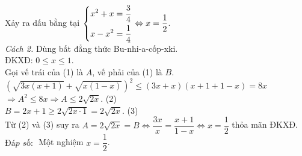 \begin{bt}
{\begin{enumerate}[a)]
    Xảy ra dấu bằng tại $\left\{\begin{aligned}&x^2+x=\dfrac{3}{4}\\&x-x^2=\dfrac{1}{4}\end{aligned}\right.\Leftrightarrow x=\dfrac{1}{2}$.\\
    \textit{Cách 2. }Dùng bất đẳng thức Bu-nhi-a-cốp-xki.\\
ĐKXĐ: $0\le x\le 1$.\\
Gọi vế trái của (1) là $A$, vế phải của (1) là $B$.\\
$\left(\sqrt{3x(x+1)}+\sqrt{x(1-x)}\right)^2\le (3x+x)(x+1+1-x)=8x$\\
$\Rightarrow A^2\le 8x\Rightarrow A\le 2\sqrt{2x}$.\hspace{2cm} (2)\\
$B=2x+1\ge 2\sqrt{2x\cdot 1}=2\sqrt{2x}$.\hspace{2cm} (3)\\
Từ (2) và (3) suy ra $A=2\sqrt{2x}=B\Leftrightarrow \dfrac{3x}{x}=\dfrac{x+1}{1-x}\Leftrightarrow x=\dfrac{1}{2}$ thỏa mãn ĐKXĐ.\\
$\textit{Đáp số: }$ Một nghiệm $x=\dfrac{1}{2}$.
    \end{enumerate}   
    }
\end{bt}

